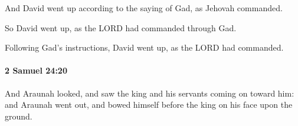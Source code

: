 			\begin{versebox}
					\item[BHS] 
					\item[ASV] And David went up according to the saying of Gad, as Jehovah commanded.
					\item[NIV] So David went up, as the LORD had commanded through Gad.
					\item[NRSV] Following Gad’s instructions, David went up, as the LORD had commanded.
			\end{versebox}

		\paragraph{2 Samuel 24:20} %
			\label{2SAMUEL-24-20}

			And Araunah looked, and saw the king and his servants coming on toward him: and Araunah went out, and bowed himself before the king on his face upon the ground.

